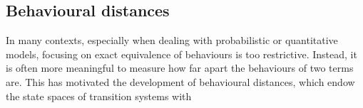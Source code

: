 \subsection{Behavioural distances}
In many contexts, especially when dealing with probabilistic or quantitative models, focusing on exact equivalence of behaviours is too restrictive. Instead, it is often more meaningful to measure how far apart the behaviours of two terms are. This has motivated the development of behavioural distances, which endow the state spaces of transition systems with


\blindtext
